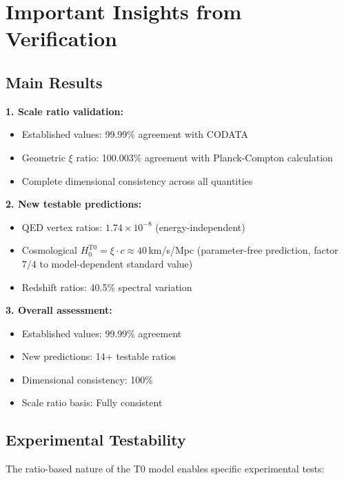 	\section{Important Insights from Verification}
	
	\subsection{Main Results}
	
	\begin{tcolorbox}[colback=green!5!white,colframe=green!75!black,title=Main Results of T0 Verification]
		\textbf{1. Scale ratio validation:}
		\begin{itemize}
			\item Established values: 99.99\% agreement with CODATA
			\item Geometric $\xi$ ratio: 100.003\% agreement with Planck-Compton calculation
			\item Complete dimensional consistency across all quantities
		\end{itemize}
		
		\textbf{2. New testable predictions:}
		\begin{itemize}
			\item QED vertex ratios: $1.74 \times 10^{-8}$ (energy-independent)
			\item Cosmological $H_0^{\text{T0}} = \xi \cdot c \approx 40\,$km/s/Mpc (parameter-free prediction, factor $7/4$ to model-dependent standard value)
			\item Redshift ratios: 40.5\% spectral variation
		\end{itemize}
		
		\textbf{3. Overall assessment:}
		\begin{itemize}
			\item Established values: 99.99\% agreement
			\item New predictions: 14+ testable ratios
			\item Dimensional consistency: 100\%
			\item Scale ratio basis: Fully consistent
		\end{itemize}
	\end{tcolorbox}
	
	\subsection{Experimental Testability}
	
	The ratio-based nature of the T0 model enables specific experimental tests:
	
